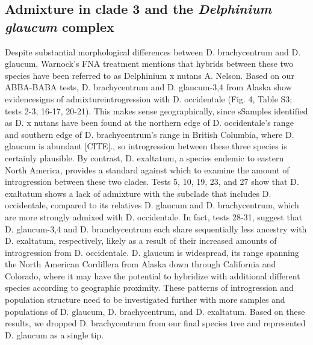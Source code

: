 \documentclass[11pt]{article}
\begin{document}
\subsection{Admixture in clade 3 and the \emph{Delphinium glaucum} complex} 
Despite substantial morphological differences between D. brachycentrum and D. glaucum, Warnock’s FNA treatment mentions that hybrids between these two species have been referred to as Delphinium x nutans A. Nelson. Based on our ABBA-BABA tests, D. brachycentrum and D. glaucum-3,4 from Alaska show evidencesigns of admixtureintrogression with D. occidentale (Fig. 4, Table S3; tests 2-3, 16-17, 20-21). This makes sense geographically, since sSamples identified as D. x nutans have been found at the northern edge of D. occidentale’s range and southern edge of D. brachycentrum’s range in British Columbia, where D. glaucum is abundant [CITE]., so introgression between these three species is certainly plausible. By contrast, D. exaltatum, a species endemic to eastern North America, provides a standard against which to examine the amount of introgression between these two clades. Tests 5, 10, 19, 23, and 27 show that D. exaltatum shows a lack of admixture with the subclade that includes D. occidentale, compared to its relatives D. glaucum and D. brachycentrum, which are more strongly admixed with D. occidentale. In fact, tests 28-31, suggest that D. glaucum-3,4 and D. branchycentrum each share sequentially less ancestry with D. exaltatum, respectively, likely as a result of their increased amounts of introgression from D. occidentale. 
% 
D. glaucum is widespread, its range spanning the North American Cordillera from Alaska down through California and Colorado, where it may have the potential to hybridize with additional different species according to geographic proximity. These patterns of introgression and population structure need to be investigated further with more samples and populations of D. glaucum, D. brachycentrum, and D. exaltatum. Based on these results, we dropped D. brachycentrum from our final species tree and represented D. glaucum as a single tip.
\end{document}
